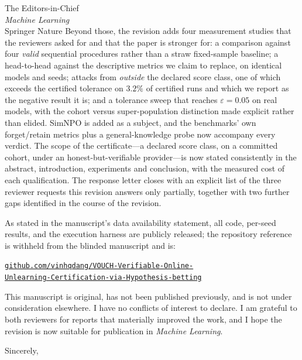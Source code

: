 \documentclass[10pt,a4paper]{letter}
\begin{document}
\begin{letter}{The Editors-in-Chief\\\emph{Machine Learning}\\Springer Nature}
Beyond those, the revision adds four measurement studies that the reviewers
asked for and that the paper is stronger for: a comparison against four
\emph{valid} sequential procedures rather than a straw fixed-sample baseline; a
head-to-head against the descriptive metrics we claim to replace, on identical
models and seeds; attacks from \emph{outside} the declared score class, one of
which exceeds the certified tolerance on $3.2\%$ of certified runs and which we
report as the negative result it is; and a tolerance sweep that reaches
$\varepsilon = 0.05$ on real models, with the cohort versus super-population
distinction made explicit rather than elided. SimNPO is added as a subject, and
the benchmarks' own forget/retain metrics plus a general-knowledge probe now
accompany every verdict. The scope of the certificate---a declared score class,
on a committed cohort, under an honest-but-verifiable provider---is now stated
consistently in the abstract, introduction, experiments and conclusion, with the
measured cost of each qualification. The response letter closes with an explicit
list of the three reviewer requests this revision answers only partially, together
with two further gaps identified in the course of the revision.

As stated in the manuscript's data availability statement, all code, per-seed
results, and the execution harness are publicly released; the repository
reference is withheld from the blinded manuscript and is:
\begin{center}
\href{https://github.com/vinhqdang/VOUCH-Verifiable-Online-Unlearning-Certification-via-Hypothesis-betting}{\texttt{github.com/vinhqdang/VOUCH-Verifiable-Online-}\\\texttt{Unlearning-Certification-via-Hypothesis-betting}}
\end{center}

This manuscript is original, has not been published previously, and is not under
consideration elsewhere. I have no conflicts of interest to declare. I am
grateful to both reviewers for reports that materially improved the work, and I
hope the revision is now suitable for publication in \emph{Machine Learning}.

\closing{Sincerely,}

\end{letter}
\end{document}
